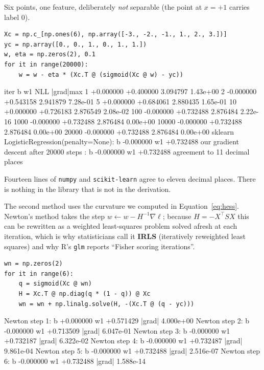 \documentclass[11pt]{article}
\begin{document}
Six points, one feature, deliberately \emph{not} separable (the point at
$x = +1$ carries label $0$).

\begin{lstlisting}
Xc = np.c_[np.ones(6), np.array([-3., -2., -1., 1., 2., 3.])]
yc = np.array([0., 0., 1., 0., 1., 1.])
w, eta = np.zeros(2), 0.1
for it in range(20000):
    w = w - eta * (Xc.T @ (sigmoid(Xc @ w) - yc))
\end{lstlisting}
\begin{codeout}
  iter        b          w1        NLL      |grad|max
     1  +0.000000  +0.400000   3.094797    1.43e+00
     2  -0.000000  +0.543158   2.941879    7.28e-01
     5  +0.000000  +0.684061   2.880435    1.65e-01
    10  +0.000000  +0.726183   2.876549    2.08e-02
   100  -0.000000  +0.732488   2.876484    2.22e-16
  1000  -0.000000  +0.732488   2.876484    0.00e+00
 10000  -0.000000  +0.732488   2.876484    0.00e+00
 20000  -0.000000  +0.732488   2.876484    0.00e+00
sklearn LogisticRegression(penalty=None):  b -0.000000  w1 +0.732488
our gradient descent after 20000 steps  :  b -0.000000  w1 +0.732488
agreement to 11 decimal places
\end{codeout}

Fourteen lines of \texttt{numpy} and \texttt{scikit-learn} agree to eleven
decimal places. There is nothing in the library that is not in the derivation.

The second method uses the curvature we computed in Equation~\eqref{eq:hess}.
Newton's method takes the step $w \leftarrow w - H^{-1}\nabla\ell$; because
$H = -X^{\!\top}SX$ this can be rewritten as a weighted least-squares problem
solved afresh at each iteration, which is why statisticians call it
\textbf{IRLS} (iteratively reweighted least squares) and why R's \texttt{glm}
reports ``Fisher scoring iterations''.

\begin{lstlisting}
wn = np.zeros(2)
for it in range(6):
    q = sigmoid(Xc @ wn)
    H = Xc.T @ np.diag(q * (1 - q)) @ Xc
    wn = wn + np.linalg.solve(H, -(Xc.T @ (q - yc)))
\end{lstlisting}
\begin{codeout}
Newton step 1:  b +0.000000  w1 +0.571429  |grad| 4.000e+00
Newton step 2:  b -0.000000  w1 +0.713509  |grad| 6.047e-01
Newton step 3:  b -0.000000  w1 +0.732187  |grad| 6.322e-02
Newton step 4:  b -0.000000  w1 +0.732487  |grad| 9.861e-04
Newton step 5:  b -0.000000  w1 +0.732488  |grad| 2.516e-07
Newton step 6:  b -0.000000  w1 +0.732488  |grad| 1.588e-14
\end{codeout}
\end{document}
